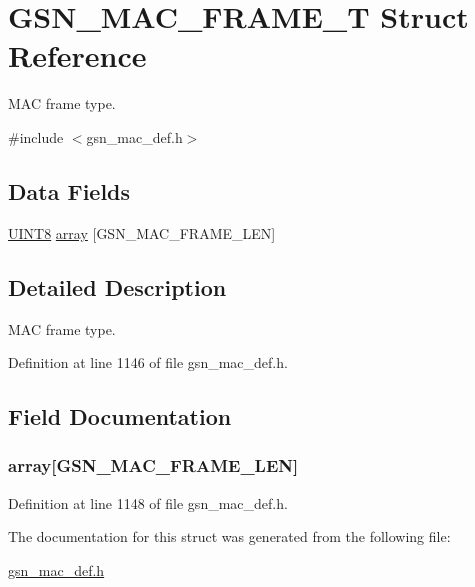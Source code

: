 \hypertarget{a00116}{
\section{GSN\_\-MAC\_\-FRAME\_\-T Struct Reference}
\label{a00116}
}


MAC frame type.  




{\ttfamily \#include $<$gsn\_\-mac\_\-def.h$>$}

\subsection*{Data Fields}
\begin{DoxyCompactItemize}
\item 
\hyperlink{a00660_gab27e9918b538ce9d8ca692479b375b6a}{UINT8} \hyperlink{a00116_a034dd367075747db83f6eba5304097a4}{array} \mbox{[}GSN\_\-MAC\_\-FRAME\_\-LEN\mbox{]}
\end{DoxyCompactItemize}


\subsection{Detailed Description}
MAC frame type. 

Definition at line 1146 of file gsn\_\-mac\_\-def.h.



\subsection{Field Documentation}
\hypertarget{a00116_a034dd367075747db83f6eba5304097a4}{
\subsubsection[{array}]{ {\bf array}\mbox{[}GSN\_\-MAC\_\-FRAME\_\-LEN\mbox{]}}}
\label{a00116_a034dd367075747db83f6eba5304097a4}


Definition at line 1148 of file gsn\_\-mac\_\-def.h.



The documentation for this struct was generated from the following file:\begin{DoxyCompactItemize}
\item 
\hyperlink{a00522}{gsn\_\-mac\_\-def.h}\end{DoxyCompactItemize}
